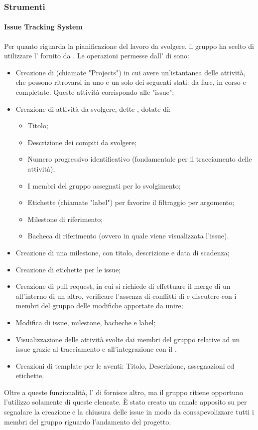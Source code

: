 \subsubsection{Strumenti}

\paragraph{Issue Tracking System}
Per quanto riguarda la pianificazione del lavoro da svolgere, il gruppo \Gruppo{} ha scelto di utilizzare l' fornito da .
Le operazioni permesse dall' di  sono:
\begin{itemize}
	\item Creazione di  (chiamate "Projects") in cui avere un'istantanea delle attività, che possono ritrovarsi in uno e un solo dei seguenti stati: da fare, in corso e completate. Queste attività corrispondo alle "issue";
	\item Creazione di attività da svolgere, dette , dotate di:
	\begin{itemize}
		\item Titolo;
		\item Descrizione dei compiti da svolgere;
		\item Numero progressivo identificativo (fondamentale per il tracciamento delle attività);
		\item I membri del gruppo assegnati per lo svolgimento;
		\item Etichette (chiamate "label") per favorire il filtraggio per argomento;
		\item Milestone di riferimento;
		\item Bacheca di riferimento (ovvero in quale  viene visualizzata l'issue).
	\end{itemize}
	\item Creazione di una milestone, con titolo, descrizione e data di scadenza;
	\item Creazione di etichette per le issue;
	\item Creazione di pull request, in cui si richiede di effettuare il merge di un  all'interno di un altro, verificare l'assenza di conflitti di  e discutere con i membri del gruppo delle modifiche apportate da unire;
	\item Modifica di issue, milestone, bacheche e label;
	\item Visualizzazione delle attività svolte dai membri del gruppo relative ad un issue grazie al tracciamento e all'integrazione con il  .
	\item Creazioni di template per le  aventi: Titolo, Descrizione, assegnazioni ed etichette.
\end{itemize}
Oltre a queste funzionalità, l' di  fornisce altro, ma il gruppo \Gruppo{} ritiene opportuno l'utilizzo solamente di queste elencate.
È stato creato un canale apposito su  per segnalare la creazione e la chiusura delle issue in modo da consapevolizzare tutti i membri del gruppo riguardo l'andamento del progetto.

